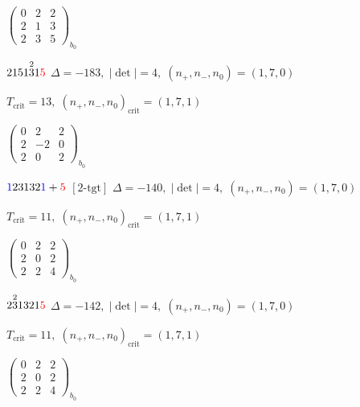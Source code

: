 \documentclass[10pt]{article}
\begin{document}
\hspace{2em}$\left(\begin{smallmatrix}0 & 2 & 2 \\ 2 & 1 & 3 \\ 2 & 3 & 5\end{smallmatrix}\right)_{\!b_0}$

\smallskip

$2151\overset{2}{3}1\textcolor{red}{5}$ \quad $\Delta=-183,\; |\det|=4,\; (n_+,n_-,n_0)=(1,7,0)$

\hspace{1em}$T_{\text{crit}}=13,\; (n_+,n_-,n_0)_{\text{crit}}=(1,7,1)$

\hspace{2em}$\left(\begin{smallmatrix}0 & 2 & 2 \\ 2 & -2 & 0 \\ 2 & 0 & 2\end{smallmatrix}\right)_{\!b_0}$

\smallskip

$\textcolor{blue}{1}23132\textcolor{blue}{1}+\textcolor{red}{5}$ $\scriptstyle [2\text{-tgt}]$ \quad $\Delta=-140,\; |\det|=4,\; (n_+,n_-,n_0)=(1,7,0)$

\hspace{1em}$T_{\text{crit}}=11,\; (n_+,n_-,n_0)_{\text{crit}}=(1,7,1)$

\hspace{2em}$\left(\begin{smallmatrix}0 & 2 & 2 \\ 2 & 0 & 2 \\ 2 & 2 & 4\end{smallmatrix}\right)_{\!b_0}$

\smallskip

$2\overset{2}{3}1321\textcolor{red}{5}$ \quad $\Delta=-142,\; |\det|=4,\; (n_+,n_-,n_0)=(1,7,0)$

\hspace{1em}$T_{\text{crit}}=11,\; (n_+,n_-,n_0)_{\text{crit}}=(1,7,1)$

\hspace{2em}$\left(\begin{smallmatrix}0 & 2 & 2 \\ 2 & 0 & 2 \\ 2 & 2 & 4\end{smallmatrix}\right)_{\!b_0}$
\end{document}
